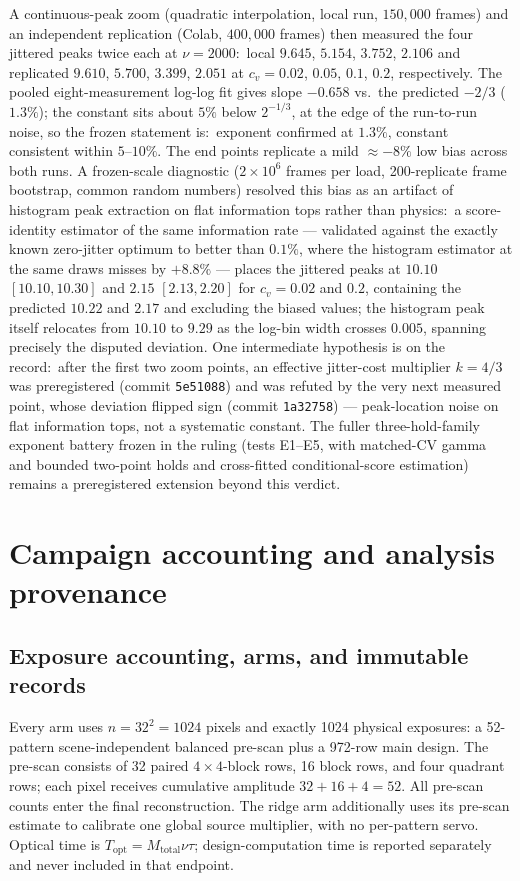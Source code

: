 \documentclass[10pt]{article}
\begin{document}
A continuous-peak zoom (quadratic interpolation, local run, $150{,}000$
frames) and an independent replication (Colab, $400{,}000$ frames) then
measured the four jittered peaks twice each at $\nu = 2000$:\ local
$9.645$, $5.154$, $3.752$, $2.106$ and replicated $9.610$, $5.700$,
$3.399$, $2.051$ at $c_v = 0.02$, $0.05$, $0.1$, $0.2$, respectively. The pooled eight-measurement log-log fit gives slope $-0.658$
vs.\ the predicted $-2/3$ ($1.3\%$); the constant sits about $5\%$ below
$2^{-1/3}$, at the edge of the run-to-run noise, so the frozen statement
is:\ exponent confirmed at $1.3\%$, constant consistent within $5$--$10\%$.
The end points replicate a mild $\approx{-8}\%$ low bias across both runs.
A frozen-scale diagnostic ($2\times10^{6}$ frames per load, 200-replicate
frame bootstrap, common random numbers) resolved this bias as an artifact
of histogram peak extraction on flat information tops rather than physics:\
a score-identity estimator of the same information rate --- validated
against the exactly known zero-jitter optimum to better than $0.1\%$, where
the histogram estimator at the same draws misses by $+8.8\%$ --- places the
jittered peaks at $10.10$ $[10.10, 10.30]$ and $2.15$ $[2.13, 2.20]$ for
$c_v = 0.02$ and $0.2$, containing the predicted $10.22$ and $2.17$ and
excluding the biased values; the histogram peak itself relocates from
$10.10$ to $9.29$ as the log-bin width crosses $0.005$, spanning precisely
the disputed deviation. One intermediate hypothesis
is on the record:\ after the first two zoom points, an effective jitter-cost
multiplier $k = 4/3$ was preregistered (commit \texttt{5e51088}) and was
refuted by the very next measured point, whose deviation flipped sign
(commit \texttt{1a32758}) --- peak-location noise on flat information tops,
not a systematic constant. The fuller three-hold-family exponent battery
frozen in the ruling (tests E1--E5, with matched-CV gamma and bounded
two-point holds and cross-fitted conditional-score estimation) remains a
preregistered extension beyond this verdict.

\section{Campaign accounting and analysis provenance}
\label{sec:s-campaign}
\subsection{Exposure accounting, arms, and immutable records}
Every arm uses $n=32^2=1024$ pixels and exactly 1024 physical exposures: a
52-pattern scene-independent balanced pre-scan plus a 972-row main design. The
pre-scan consists of 32 paired $4\times4$-block rows, 16 block rows, and four
quadrant rows; each pixel receives cumulative amplitude $32+16+4=52$. All
pre-scan counts enter the final reconstruction. The ridge arm additionally
uses its pre-scan estimate to calibrate one global source multiplier, with no
per-pattern servo. Optical time is
$T_{\mathrm{opt}}=M_{\mathrm{total}}\nu\tau$; design-computation time is
reported separately and never included in that endpoint.
\end{document}
